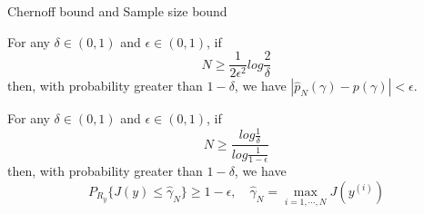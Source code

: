 \documentclass[10pt]{beamer}
\begin{document}
\begin{frame}{Chernoff bound and Sample size bound}
\begin{theorem}
        \label{tm:Chernoff}
        For any $ \delta \in (0,1)$ and $\epsilon \in (0,1)$, if
        \begin{equation}
        N \geq \frac{1}{2\epsilon^2}log\frac{2}{\delta}
        \label{eq:Chernoff}
        \end{equation}
        then, with probability greater than $1-\delta$, we have $\left|\hat{p}_N(\gamma)-p(\gamma)\right|<\epsilon$.
    \end{theorem}
    \begin{theorem}
        \label{th:worst-case}
        For any $ \delta \in (0,1)$ and $\epsilon \in (0,1)$, if
        \begin{equation}
        N \geq \frac{log\frac{1}{\delta}}{log\frac{1}{1-\epsilon}}
        \label{eq:worstcase}
        \end{equation}
        then, with probability greater than $1-\delta$, we have 
        \begin{equation}
        P_{R_{y}} \{J(y) \leq \hat{\gamma}_N \} \geq 1-\epsilon, \quad \hat{\gamma}_N = \max_{i=1,\cdots,N}J(y^{(i)})
        \end{equation}
        \end{theorem}
    \end{frame}
\end{document}
